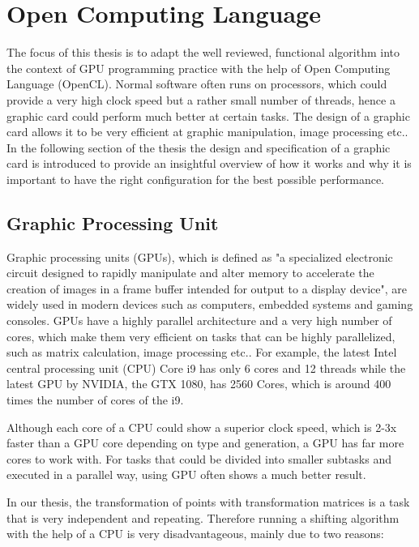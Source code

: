 \chapter{Open Computing Language}
The focus of this thesis is to adapt the well reviewed, functional algorithm into the context of GPU programming practice with the help of Open Computing Language (OpenCL). Normal software often runs on processors, which could provide a very high clock speed but a rather small number of threads, hence a graphic card could perform much better at certain tasks. The design of a graphic card allows it to be very efficient at graphic manipulation, image processing etc.. In the following section of the thesis the design and specification of a graphic card is introduced to provide an insightful overview of how it works and why it is important to have the right configuration for the best possible performance.  
\section{Graphic Processing Unit}
Graphic processing units (GPUs), which is defined as "a specialized electronic circuit designed to rapidly manipulate and alter memory to accelerate the creation of images in a frame buffer intended for output to a display device", are widely used in modern devices such as computers, embedded systems and gaming consoles. GPUs have a highly parallel architecture and a very high number of cores, which make them very efficient on tasks that can be highly parallelized, such as matrix calculation, image processing etc..  For example, the latest Intel central processing unit (CPU) Core i9 has only 6 cores and 12 threads while the latest GPU by NVIDIA, the GTX 1080, has 2560 Cores, which is around 400 times the number of cores of the i9.

Although each core of a CPU could show a superior clock speed, which is 2-3x faster than a GPU core depending on type and generation, a GPU has far more cores to work with. For tasks that could be divided into smaller subtasks and executed in a parallel way, using GPU often shows a much better result.

In our thesis, the transformation of points with transformation matrices is a task that is very independent and repeating. Therefore running a shifting algorithm with the help of a CPU is very disadvantageous, mainly due to two reasons:

